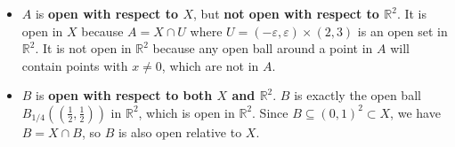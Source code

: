 \begin{exercisesolution}
\begin{itemize}
  \item $A$ is \textbf{open with respect to $X$}, but \textbf{not open with respect to $\mathbb{R}^2$}. It is open in $X$ because $A = X \cap U$ where $U = (-\varepsilon, \varepsilon) \times (2,3)$ is an open set in $\mathbb{R}^2$. It is not open in $\mathbb{R}^2$ because any open ball around a point in $A$ will contain points with $x \neq 0$, which are not in $A$.
  \item $B$ is \textbf{open with respect to both $X$ and $\mathbb{R}^2$}. $B$ is exactly the open ball $B_{1/4}((\tfrac12, \tfrac12))$ in $\mathbb{R}^2$, which is open in $\mathbb{R}^2$. Since $B \subseteq (0,1)^2 \subset X$, we have $B = X \cap B$, so $B$ is also open relative to $X$.
\end{itemize}
\end{exercisesolution}
